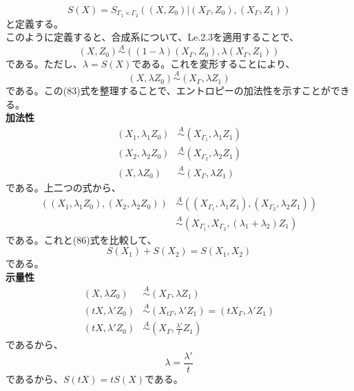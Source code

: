 \documentclass[a4paper,11pt]{jsarticle}
\numberwithin{equation}{section}
\begin{document}
\begin{equation}
    S(X)=S_{\Gamma_1 \times \Gamma_2}((X,Z_0)|(X_{\Gamma},Z_0),(X_{\Gamma},Z_1))
\end{equation}
と定義する。\\
このように定義すると、合成系について、Le.2.3を適用することで、
\begin{equation}
    (X,Z_0) \overset{A}{\sim} ((1-\lambda)(X_{\Gamma},Z_0),\lambda(X_{\Gamma},Z_1))
\end{equation}
である。ただし、$\lambda = S(X)$である。これを変形することにより、
\begin{equation}
    (X,\lambda Z_0) \overset{A}{\sim} (X_{\Gamma},\lambda Z_1)
\end{equation}
である。この(83)式を整理することで、エントロピーの加法性を示すことができる。\\
\textbf{加法性}\\
\begin{align}
    (X_1,\lambda_1 Z_0) &\overset{A}{\sim} (X_{\Gamma_1},\lambda_1 Z_1)\\
    (X_2,\lambda_2 Z_0) &\overset{A}{\sim} (X_{\Gamma_2},\lambda_2 Z_1)\\
    (X,\lambda Z_0) &\overset{A}{\sim} (X_{\Gamma},\lambda Z_1)
\end{align}
である。上二つの式から、
\begin{align}
    ((X_1,\lambda_1 Z_0),(X_2,\lambda_2 Z_0)) &\overset{A}{\sim} ((X_{\Gamma_1},\lambda_1 Z_1),(X_{\Gamma_2},\lambda_2 Z_1))\\
    &\overset{A}{\sim} (X_{\Gamma_1},X_{\Gamma_2},(\lambda_1+\lambda_2)Z_1)
\end{align}
である。これと(86)式を比較して、
\begin{equation}
    S(X_1)+S(X_2) = S(X_1,X_2)
\end{equation}
である。\\
\textbf{示量性}\\
\begin{align}
    (X,\lambda Z_0) &\overset{A}{\sim} (X_{\Gamma},\lambda Z_1)\\
    (tX,\lambda' Z_0) &\overset{A}{\sim} (X_{t\Gamma},\lambda' Z_1)=(tX_{\Gamma},\lambda' Z_1)\\
    (tX,\lambda' Z_0) &\overset{A}{\sim} (X_{\Gamma},\frac{\lambda'}{t} Z_1)
\end{align}
であるから、
\begin{equation}
    \lambda = \frac{\lambda'}{t}
\end{equation}
であるから、$S(tX)=tS(X)$である。\\
\end{document}

